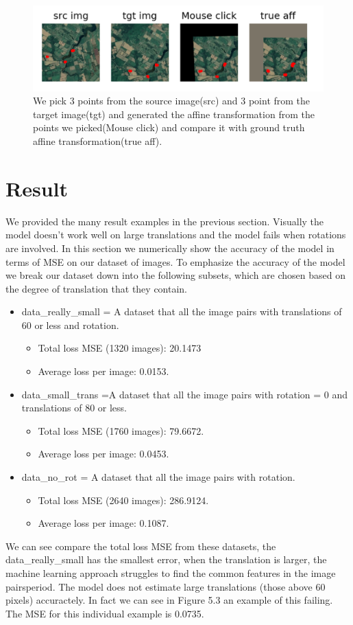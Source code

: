 \begin{figure}
\centering
\includegraphics[width = 5.0in]{figs/click_60down_60right}
\caption{We pick 3 points from the source image(src) and 3 point from the target image(tgt) and generated the affine transformation from the points we picked(Mouse click) and compare it with  ground truth affine transformation(true aff).}
\end{figure}

\section{Result}
  We provided the many result examples in the previous section. Visually the model doesn't work well on large translations and the model fails when rotations are involved. In this section we numerically show the accuracy of the model in terms of MSE on our dataset of images. To emphasize the accuracy of the model we break our dataset down into the following subsets, which are chosen based on the degree of translation that they contain.
\begin{itemize}
\item data\_really\_small = A dataset that all the image pairs with translations of 60 or less and rotation.
\begin{itemize}
\item Total loss MSE (1320 images): 20.1473
\item Average loss per image: 0.0153.
\end{itemize}

\item  data\_small\_trans =A dataset that all the image pairs with rotation = 0 and translations of 80 or less.
\begin{itemize}
\item Total loss MSE (1760 images): 79.6672.
\item Average loss per image: 0.0453.
\end{itemize}

\item data\_no\_rot = A dataset that all the image pairs with rotation.
\begin{itemize}
\item Total loss MSE (2640 images):  286.9124.
\item Average loss per image:  0.1087.
\end{itemize}
\end{itemize}
  We can see compare the total loss MSE from these datasets, the data\_really\_small has the smallest error, when the translation is larger, the machine learning approach struggles to find the common features in the image pairsperiod. The model does not estimate large translations (those above 60 pixels) accuractely. In fact we can see in Figure 5.3 an example of this failing. The MSE for this individual example is 0.0735.
 
